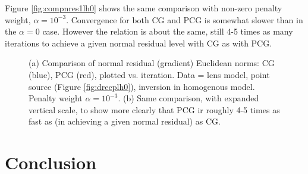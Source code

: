 \documentclass[12pt]{geophysics}
\begin{document}
Figure \ref{fig:compnres1lh0} shows the same comparison with non-zero
penalty weight, $\alpha=10^{-3}$. Convergence for both CG and PCG is
somewhat slower than in the $\alpha=0$ case. However the relation is
about the same, still 4-5 times as many iterations to achieve a given
normal residual level with CG as with PCG.

\begin{figure}
  \centering
  \caption{(a) Comparison of normal residual 
  (gradient) Euclidean norms: CG (blue), PCG (red), plotted 
  vs. iteration. Data = lens model, point source (Figure 
  \ref{fig:drecplh0}), inversion in homogenous model. Penalty weight 
  $\alpha=10^{-3}$. (b) Same comparison, with expanded vertical scale, to
  show more clearly that PCG ir roughly 4-5 times as fast as (in
  achieving a given normal residual) as CG.}
\end{figure}




\section{Conclusion}
\end{document}
